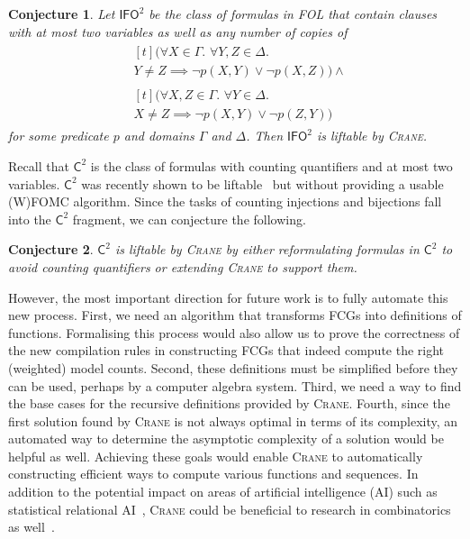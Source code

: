 \documentclass{article}
\newtheorem{conjecture}{Conjecture}
\theoremstyle{definition}
\newcommand{\Ctwo}{$\mathsf{C}^{2}$}
\newcommand{\IFO}{$\mathsf{I}\mathsf{FO}^{2}$}
\begin{document}
\begin{conjecture}
  Let \IFO{} be the class of formulas in FOL that contain clauses with at most
  two variables as well as any number of copies of
  \begin{align*}
    &\begin{multlined}[t]
      (\forall X \in \Gamma\text{. }\forall Y, Z \in \Delta\text{. }\\
      Y \ne Z \implies \neg p(X, Y) \lor \neg p(X, Z)) \land
    \end{multlined}\\
    &\begin{multlined}[t]
      (\forall X, Z \in \Gamma\text{. }\forall Y \in \Delta\text{. }\\
      X \ne Z \implies \neg p(X, Y) \lor \neg p(Z, Y))
    \end{multlined}
  \end{align*}
  for some predicate $p$ and domains $\Gamma$ and $\Delta$. Then \IFO{} is
  liftable by \textsc{Crane}.
\end{conjecture}

Recall that \Ctwo{} is the class of formulas with counting quantifiers and at
most two variables. \Ctwo{} was recently shown to be
liftable~\cite{DBLP:journals/jair/Kuzelka21} but without providing a usable
(W)FOMC algorithm. Since the tasks of counting injections and bijections fall
into the \Ctwo{} fragment, we can conjecture the following.

\begin{conjecture}
  \Ctwo{} is liftable by \textsc{Crane} by either reformulating formulas in
  \Ctwo{} to avoid counting quantifiers or extending \textsc{Crane} to support
  them.
\end{conjecture}

However, the most important direction for future work is to fully automate this
new process. First, we need an algorithm that transforms FCGs into definitions
of functions. Formalising this process would also allow us to prove the
correctness of the new compilation rules in constructing FCGs that indeed
compute the right (weighted) model counts. Second, these definitions must be
simplified before they can be used, perhaps by a computer algebra system. Third,
we need a way to find the base cases for the recursive definitions provided by
\textsc{Crane}. Fourth, since the first solution found by \textsc{Crane} is not
always optimal in terms of its complexity, an automated way to determine the
asymptotic complexity of a solution would be helpful as well. Achieving these
goals would enable \textsc{Crane} to automatically constructing efficient ways
to compute various functions and sequences. In addition to the potential impact
on areas of artificial intelligence (AI) such as statistical relational
AI~\cite{DBLP:series/synthesis/2016Raedt}, \textsc{Crane} could be beneficial to
research in combinatorics as well~\cite{DBLP:conf/ilp/BarvinekB0ZK21}.
\end{document}
